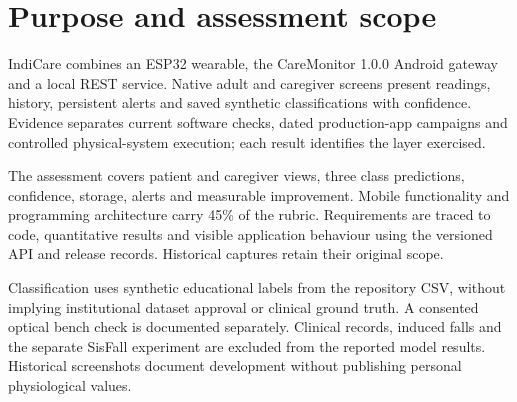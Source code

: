 \section{Purpose and assessment scope}
\label{sec:purpose}
\begin{reportprose}
IndiCare combines an ESP32 wearable, the CareMonitor 1.0.0 Android gateway and a local REST service. Native adult and caregiver screens present readings, history, persistent alerts and saved synthetic classifications with confidence. Evidence separates current software checks, dated production-app campaigns and controlled physical-system execution; each result identifies the layer exercised.

The assessment covers patient and caregiver views, three class predictions, confidence, storage, alerts and measurable improvement. Mobile functionality and programming architecture carry 45\% of the rubric. Requirements are traced to code, quantitative results and visible application behaviour using the versioned API and release records. Historical captures retain their original scope.\cite{rubric,snapshot}

Classification uses synthetic educational labels from the repository CSV, without implying institutional dataset approval or clinical ground truth. A consented optical bench check is documented separately. Clinical records, induced falls and the separate SisFall experiment are excluded from the reported model results. Historical screenshots document development without publishing personal physiological values.
\end{reportprose}

